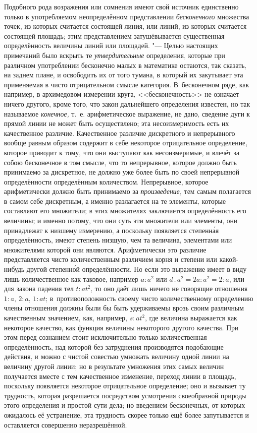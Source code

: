 Подобного рода возражения или сомнения имеют свой источник единственно только в
употребляемом неопределённом представлении {\em бесконечного} множества точек,
из которых считается состоящей линия, или линий, из которых считается состоящей
площадь; этим представлением затушёвывается существенная определённость
величины линий или площадей. "--- Целью настоящих примечаний было вскрыть те
{\em утвердительные} определения, которые при различном употреблении
бесконечно малых в математике остаются, так сказать, на заднем плане, и
освободить их от того тумана, в который их закутывает эта применяемая в чисто
отрицательном смысле категория. В~бесконечном ряде, как например, в архимедовом
измерении круга, <<бесконечность>> не означает ничего другого, кроме того, что
закон дальнейшего определения известен, но так называемое {\em конечное,} т.~е.
арифметическое выражение, не дано, сведение дуги к прямой линии не может быть
осуществлено; эта несоизмеримость есть их качественное различие. Качественное
различие дискретного и непрерывного вообще равным образом содержит в себе
некоторое отрицательное определение, которое приводит к тому, что они выступают
как несоизмеримые, и влечёт за собою бесконечное в том смысле, что то
непрерывное, которое должно быть принимаемо за дискретное, не должно уже более
быть по своей непрерывной определённости определённым количеством. Непрерывное,
которое арифметически должно быть принимаемо за {\em произведение,} тем самым
полагается в самом себе дискретным, а именно разлагается на те элементы,
которые составляют его множители; в этих множителях заключается определённость
его величины; и именно потому, что они суть эти множители или элементы, они
принадлежат к низшему измерению, а поскольку появляется степенн\'{а}я
определённость, имеют степень низшую, чем та величина, элементами или
множителями которой они являются. Арифметически это различие представляется
чисто количественным различием корня и степени или какой-нибудь другой
степенн\'{о}й определённости. Но если это выражение имеет в виду лишь
количественное как таковое, например $a:a^2$ или $d\,.\,a^2=2a:a^2=2:a$, или
для закона падения тел $t:at^2$, то оно даёт лишь ничего не говорящие отношения
$1:a$, $2:a$, $1:at$; в~противоположность своему чисто количественному
определению члены отношения должны были бы быть удерживаемы врозь своим
различным качественным значением, как, например, $s:at^2$, где величина
выражается как некоторое качество, как функция величины некоторого другого
качества. При этом перед сознанием стоит исключительно только количественная
определённость, над которой без затруднения производятся подобающие действия,
и можно с чистой совестью умножать величину одной линии на величину другой
линии; но в результате умножения этих самых величин получается вместе с тем
качественное изменение, переход линии в площадь, поскольку появляется некоторое
отрицательное определение; оно и вызывает ту трудность, которая разрешается
посредством усмотрения своеобразной природы этого определения и простой сути
дела; но введением бесконечных, от которых ожидалось её устранение, эта
трудность скорее только ещё более запутывается и оставляется совершенно
неразрешённой.
